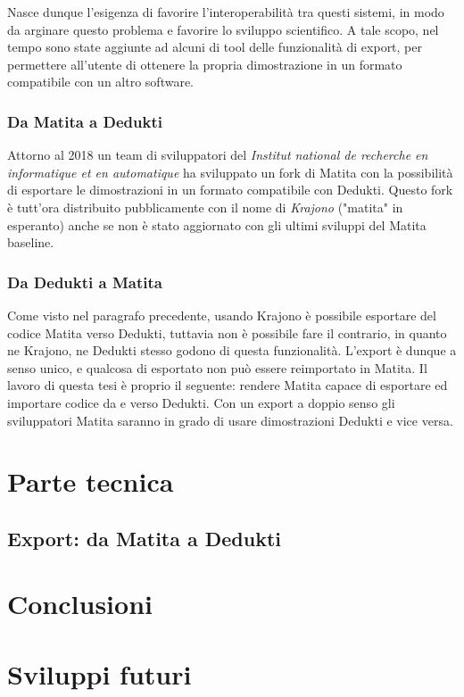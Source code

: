 \documentclass[12pt,a4paper]{report}
\begin{document}
Nasce dunque l'esigenza di favorire l'interoperabilità tra questi sistemi, in
modo da arginare questo problema e favorire lo sviluppo scientifico. 
A tale scopo, nel tempo sono state aggiunte ad alcuni di tool delle funzionalità
di export, per permettere all'utente di ottenere la propria dimostrazione in un
formato compatibile con un altro software.

\subsection{Da Matita a Dedukti}
Attorno al 2018 un team di sviluppatori del \textit{Institut national de recherche
en informatique et en automatique} %
ha sviluppato un fork di Matita con la possibilità di esportare le dimostrazioni
in un formato compatibile con Dedukti. Questo fork è tutt'ora distribuito 
pubblicamente con il nome di \textit{Krajono} ("matita" in esperanto) anche se 
non è stato aggiornato con gli ultimi sviluppi del Matita baseline.

\subsection{Da Dedukti a Matita}
Come visto nel paragrafo precedente, usando Krajono è possibile esportare 
del codice Matita verso Dedukti, tuttavia non è possibile fare il contrario,
in quanto ne Krajono, ne Dedukti stesso godono di questa funzionalità.
L'export è dunque a senso unico, e qualcosa di esportato non può essere
re\-importato in Matita. Il lavoro di questa tesi è proprio il seguente:
rendere Matita capace di esportare ed importare codice da e verso Dedukti.
Con un export a doppio senso gli sviluppatori Matita saranno in grado 
di usare dimostrazioni Dedukti e vice versa.


\chapter{Parte tecnica} %
\section{Export: da Matita a Dedukti}




\chapter{Conclusioni}

\chapter{Sviluppi futuri}
\end{document}
